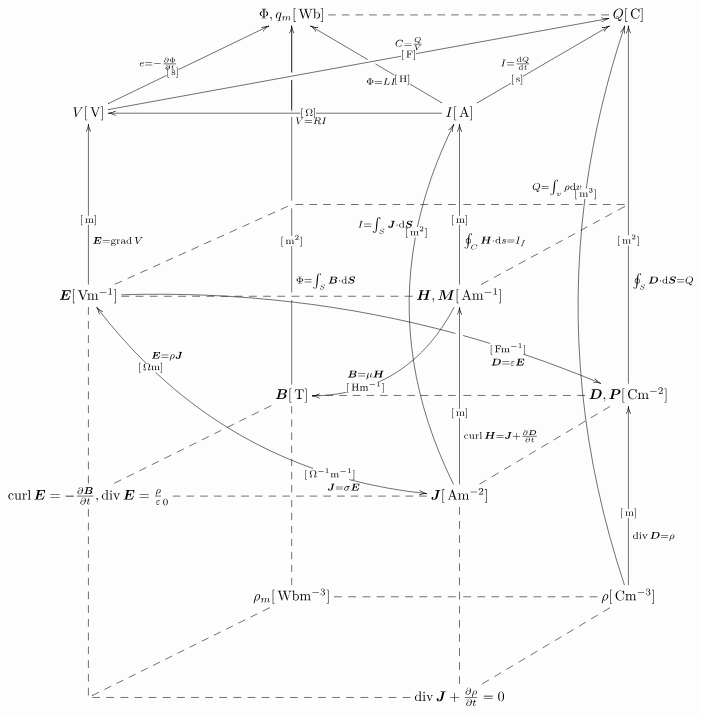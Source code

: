 \documentclass[a4j,8pt]{jarticle}
\makeatletter
\def\uni#1{[\unit{#1}]}
\def\cell#1#2{#1\uni{#2}}
\def\dottedhole#1{\ar@{--}[#1]|!{[ld];[lu]}\hole}
\def\dotted#1{\ar@{--}[#1]}
\def\arrow#1#2#3{\ar[#1]|-(.4){\uni{#2}}_(.3){#3}}
\def\arroww#1#2#3{\ar[#1]|-(.3){\uni{#2}}^(.4){#3}|!{[ll];[ru]}\hole}
\def\arrowu#1#2#3{\ar[#1]|-(.4){\uni{#2}}^(.4){#3}}
\def\arrowx#1#2#3{\ar[#1]|-(.6){\uni{#2}}^(.6){#3}}
\def\arrowy#1#2#3{\ar@/^3pc/[#1]|-(.7){\uni{#2}}^(.7){#3}}
\def\arrowyy#1#2#3#4#5{\ar@/_3pc/@{<->}[#1]|-(0.2){\uni{#4}}^(0.2){#5}|-(.75){\uni{#2}}_(.75){#3}}
\def\arrowz#1#2#3{\ar@/^2pc/[#1]|-(.7){\uni{#2}}_(.6){#3}}
\def\arrowzz#1#2#3{\ar@/^2pc/[#1] |!{[rr];[rrdd]}\hole |-(.8){\uni{#2}}_(.8){#3\quad}}
\def\arrowp#1#2#3{\ar@{->}[#1] _(.3){#3} |!{[u];[u]}\hole |-(0.4){\uni{#2}} |!{[uu];[uu]}\hole |!{[uuu];[uuu]}\hole |!{[luuu];[ruuuru]}\hole} %
\makeatother
\begin{document}
\[\xymatrix@=0.75in{
 & \cell{\Phi, q_m}{Wb}\dotted{rr}\ar @{-}[d]|!{[ld];[rr]}\hole     &                                                                                                                                        & \cell{Q}{C}\\
 \cell V V\arrowu{ur}{s}{e=-\fracpd\Phi t}\arrowx{rrru}{F}{C=\frac Q V}                                                                                                                      &                                                                  & \cell I A\arrowu{ll}{O}{V=RI}\arroww{ur}{s}{I=\diff Q t}\arroww{lu}{H}{\Phi=LI}                                                        & \\
 &                                                                  &                                                                                                                                        & \dottedhole{ll}\dotted{ld}\\
 \cell{\bm E}{Vm^{-1}}\arrow{uu}{m}{\bm E=\grad V}\dotted{rr}\dotted{ru}\arrowzz{rrrd}{Fm^{-1}}{\bm D=\varepsilon\bm E}\arrowyy{rrdd}{O^{-1}m^{-1}}{\bm J=\sigma\bm E}{Om}{\bm E=\rho\bm J } &                                                                  & \cell{\bm H,\bm M}{Am^{-1}}\arrow{uu}{m}{\oint_C\bm H\cdot\dd s=I_f}\arrowz{dl}{Hm^{-1}}{\bm B=\mu\bm H}                               & \\
 & \cell{\bm B}{T}\arrowp{uuuu}{m^2}{\Phi=\int_S\bm B\cdot\dd\bm S} &                                                                                                                                        & \cell{\bm D,\bm P}{Cm^{-2}}\arrow{uuuu}{m^2}{\oint_S\bm D\cdot\dd\bm{S}=Q}\dottedhole{ll}\dotted{ld}\\
 {{\curl\bm E=-\frac{\partial\bm B}{\partial t}} ,{\diver\bm E=\frac\rho\varepsilon_0}}\dotted{uu}\dotted{rr}\dotted{ru}                                                                     &                                                                  & \cell{\bm J}{Am^{-2}}\arrow{uu}{m}{\curl\bm H=\bm J +\frac{\partial\bm D}{\partial t}}\arrowy{uuuu}{m^2}{I=\int_S\bm J\cdot\dd\bm S}\\
 & \cell{\rho_m}{Wbm^{-3}}\ar@{--}[uu]|!{[u];[u]}\hole              &                                                                                                                                        & \cell{\rho}{Cm^{-3}}\arrow{uu}{m}{\diver\bm D=\rho}\arrowy{uuuuuu}{m^3}{Q=\int_v\rho\dd v}\dottedhole{ll}\dotted{ld}\\
 \dotted{uu}\dotted{rr}\dotted{ru}                                                                                                                                                           &                                                                  & \diver\bm J +\frac{\partial\rho}{\partial t}=0\dotted{uu}                                                                              & \\
}\]
\end{document}
